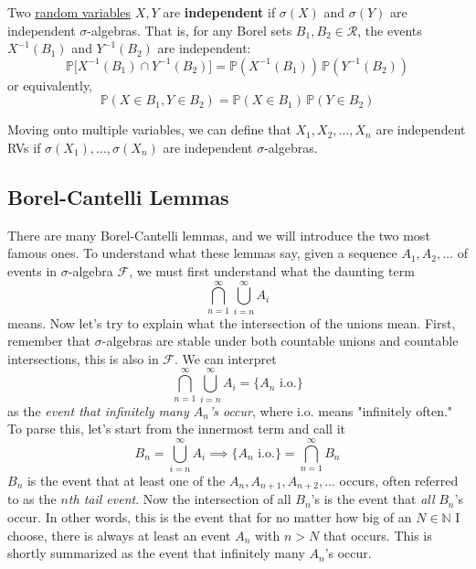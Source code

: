   \begin{definition}
    \label{def:independent-random-variables}
    Two \hyperref[def:random-variable]{random variables} $X, Y$ are \textbf{independent} if $\sigma(X)$ and $\sigma(Y)$ are independent $\sigma$-algebras. That is, for any Borel sets $B_1, B_2 \in \mathcal{R}$, the events $X^{-1}(B_1)$ and $Y^{-1}(B_2)$ are independent: 
    \begin{equation}
      \mathbb{P}\big[ X^{-1}(B_1) \cap Y^{-1}(B_2) \big] = \mathbb{P}(X^{-1}(B_1)) \, \mathbb{P}(Y^{-1}(B_2))
    \end{equation}
    or equivalently, 
    \begin{equation}
      \mathbb{P}(X \in B_1, Y \in B_2) = \mathbb{P}(X \in B_1) \, \mathbb{P}(Y \in B_2)
    \end{equation}
  \end{definition}

  Moving onto multiple variables, we can define that $X_1, X_2, \ldots, X_n$ are independent RVs if $\sigma(X_1), \ldots, \sigma(X_n)$ are independent $\sigma$-algebras. 

\subsection{Borel-Cantelli Lemmas}

  There are many Borel-Cantelli lemmas, and we will introduce the two most famous ones. To understand what these lemmas say, given a sequence $A_1, A_2, \ldots$ of events in $\sigma$-algebra $\mathcal{F}$, we must first understand what the daunting term  
  \begin{equation}
    \bigcap_{n=1}^\infty \bigcup_{i = n}^\infty A_i
  \end{equation}
  means. Now let's try to explain what the intersection of the unions mean. First, remember that $\sigma$-algebras are stable under both countable unions and countable intersections, this is also in $\mathcal{F}$. We can interpret 
  \begin{equation}
    \bigcap_{n=1}^\infty \bigcup_{i=n}^\infty A_i = \{ A_n \text{ i.o.}\}
  \end{equation}
  as the \textit{event that infinitely many $A_n$'s occur}, where i.o. means "infinitely often." To parse this, let's start from the innermost term and call it 
  \begin{equation}
    B_n = \bigcup_{i=n}^\infty A_i \implies \{A_n \text{ i.o.}\} = \bigcap_{n=1}^\infty B_n
  \end{equation}
  $B_n$ is the event that at least one of the $A_n, A_{n+1}, A_{n+2}, \ldots$ occurs, often referred to as the \textit{$n$th tail event}. Now the intersection of all $B_n$'s is the event that \textit{all} $B_n$'s occur. In other words, this is the event that for no matter how big of an $N \in \mathbb{N}$ I choose, there is always at least an event $A_n$ with $n > N$ that occurs. This is shortly summarized as the event that infinitely many $A_n$'s occur. 

